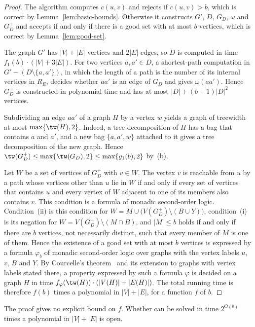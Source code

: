 \begin{proof}
The algorithm computes $c(u,v)$ and rejects if $c(u,v) > b$, which is correct by Lemma~\ref{lem:basic-bounds}.
Otherwise it constructs $G'$, $D$, $G_D$, $\omega$ and $G_D^+$ and accepts if and only if there is a good set with at most $b$ vertices, which is correct by Lemma~\ref{lem:good-set}.

The graph $G'$ has $|V| + |E|$ vertices and $2|E|$ edges, so $D$ is computed in time $f_1(b) \cdot (|V| + 3|E|)$.
For two vertices $a, a' \in D$, a shortest-path computation in $G' - (D \setminus \{a, a'\})$, in which the length of a path is the number of its internal vertices in $R_E$, decides whether $aa'$ is an edge of $G_D$ and gives $\omega(aa')$.
Hence $G_D^+$ is constructed in polynomial time and has at most $|D| + (b+1)|D|^2$ vertices.

Subdividing an edge $aa'$ of a graph $H$ by a vertex $w$ yields a graph of treewidth at most $\max\{\tw(H), 2\}$.
Indeed, a tree decomposition of $H$ has a bag that contains $a$ and $a'$, and a new bag $\{a, a', w\}$ attached to it gives a tree decomposition of the new graph.
Hence $\tw(G_D^+) \leq \max\{\tw(G_D), 2\} \leq \max\{g_1(b), 2\}$ by~(b).

Let $W$ be a set of vertices of $G_D^+$ with $v \in W$.
The vertex $v$ is reachable from $u$ by a path whose vertices other than $u$ lie in $W$ if and only if every set of vertices that contains $u$ and every vertex of $W$ adjacent to one of its members also contains $v$.
This condition is a formula of monadic second-order logic.
Condition~(ii) is this condition for $W = M \cup \bigl(V(G_D^+) \setminus (B \cup Y)\bigr)$, condition~(i) is its negation for $W = V(G_D^+) \setminus (M \cap B)$, and $|M| \leq b$ holds if and only if there are $b$ vertices, not necessarily distinct, such that every member of $M$ is one of them.
Hence the existence of a good set with at most $b$ vertices is expressed by a formula $\varphi_b$ of monadic second-order logic over graphs with the vertex labels $u$, $v$, $B$ and $Y$.
By Courcelle's theorem~\cite[Theorem~2.2]{Marx2013Separators} and its extension to graphs with vertex labels stated there, a property expressed by such a formula $\varphi$ is decided on a graph $H$ in time $f_\varphi(\tw(H)) \cdot (|V(H)| + |E(H)|)$.
The total running time is therefore $f(b)$ times a polynomial in $|V| + |E|$, for a function $f$ of $b$.
\end{proof}

The proof gives no explicit bound on $f$.
Whether \MinCutPath{} can be solved in time $2^{O(b)}$ times a polynomial in $|V| + |E|$ is open.

